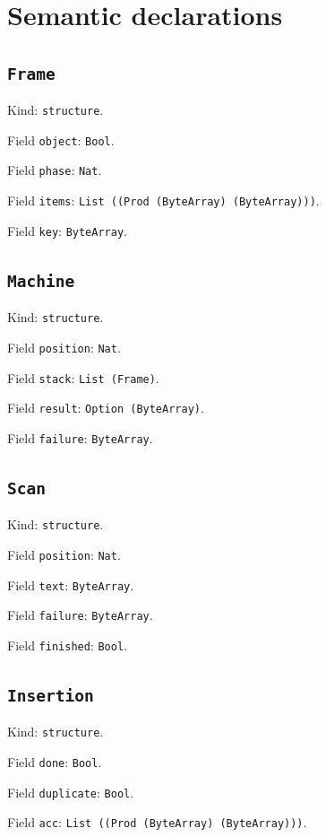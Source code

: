 \documentclass[11pt]{article}
\begin{document}
\section*{Semantic declarations}
\subsection*{\texttt{Frame}}
\noindent Kind: \texttt{structure}.\par
\noindent Field \texttt{object}: \texttt{Bool}.\par
\noindent Field \texttt{phase}: \texttt{Nat}.\par
\noindent Field \texttt{items}: \texttt{List ((Prod (ByteArray) (ByteArray)))}.\par
\noindent Field \texttt{key}: \texttt{ByteArray}.\par
\subsection*{\texttt{Machine}}
\noindent Kind: \texttt{structure}.\par
\noindent Field \texttt{position}: \texttt{Nat}.\par
\noindent Field \texttt{stack}: \texttt{List (Frame)}.\par
\noindent Field \texttt{result}: \texttt{Option (ByteArray)}.\par
\noindent Field \texttt{failure}: \texttt{ByteArray}.\par
\subsection*{\texttt{Scan}}
\noindent Kind: \texttt{structure}.\par
\noindent Field \texttt{position}: \texttt{Nat}.\par
\noindent Field \texttt{text}: \texttt{ByteArray}.\par
\noindent Field \texttt{failure}: \texttt{ByteArray}.\par
\noindent Field \texttt{finished}: \texttt{Bool}.\par
\subsection*{\texttt{Insertion}}
\noindent Kind: \texttt{structure}.\par
\noindent Field \texttt{done}: \texttt{Bool}.\par
\noindent Field \texttt{duplicate}: \texttt{Bool}.\par
\noindent Field \texttt{acc}: \texttt{List ((Prod (ByteArray) (ByteArray)))}.\par
\end{document}
